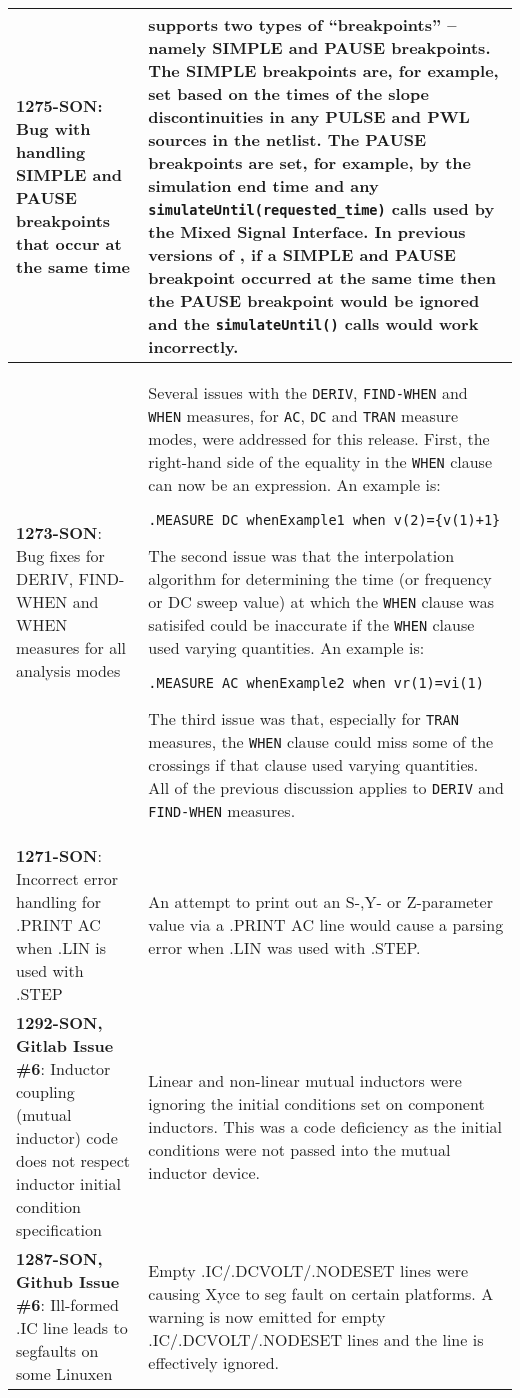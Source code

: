 {\begin{longtable}[h] {>{\raggedright\small}m{2in}|>{\raggedright\let\\\tabularnewline\small}m{3.5in}}
\textbf{1275-SON}: Bug with handling SIMPLE and PAUSE breakpoints that occur at the same time &
\Xyce{} supports two types of ``breakpoints'' -- namely SIMPLE and PAUSE breakpoints.  The SIMPLE
breakpoints are, for example, set based on the times of the slope discontinuities in any PULSE
and PWL sources in the netlist.  The PAUSE breakpoints are set, for example, by the simulation
end time and any \texttt{simulateUntil(requested\_time)} calls used by the Mixed Signal Interface.
In previous versions of \Xyce{}, if a SIMPLE and PAUSE breakpoint occurred at the same time
then the PAUSE breakpoint would be ignored and the \texttt{simulateUntil()} calls would work
incorrectly.
\\ \hline

\textbf{1273-SON}: Bug fixes for DERIV, FIND-WHEN and WHEN measures for all analysis modes &
Several issues with the \texttt{DERIV}, \texttt{FIND-WHEN} and \texttt{WHEN} measures, for \texttt{AC},
\texttt{DC} and \texttt{TRAN} measure modes, were addressed for this release.  First,
the right-hand side of the equality in the \texttt{WHEN} clause can now be an expression.
An example is:
\begin{verbatim}
.MEASURE DC whenExample1 when v(2)={v(1)+1}
\end{verbatim}
The second issue was that the interpolation algorithm for determining the time
(or frequency or DC sweep value) at which the \texttt{WHEN} clause was satisifed
could be inaccurate if the \texttt{WHEN} clause used varying quantities.
An example is:
\begin{verbatim}
.MEASURE AC whenExample2 when vr(1)=vi(1)
\end{verbatim}
The third issue was that, especially for \texttt{TRAN} measures, the \texttt{WHEN}
clause could miss some of the crossings if that clause used varying quantities.  All of
the previous discussion applies to \texttt{DERIV} and \texttt{FIND-WHEN} measures.
\\ \hline

\textbf{1271-SON}: Incorrect error handling for .PRINT AC when .LIN is used with
.STEP & An attempt to print out an S-,Y- or Z-parameter value via a .PRINT AC line
would cause a parsing error when .LIN was used with .STEP.
\\ \hline

\textbf{1292-SON, Gitlab Issue \#6}: Inductor coupling (mutual inductor) code does not respect inductor initial condition specification &
Linear and non-linear mutual inductors were ignoring the initial conditions set on 
component inductors.  This was a code deficiency as the initial conditions were not 
passed into the mutual inductor device.
\\ \hline

\textbf{1287-SON, Github Issue \#6}: Ill-formed .IC line leads to segfaults on some Linuxen
& Empty .IC/.DCVOLT/.NODESET lines were causing Xyce to seg fault on certain platforms.
A warning is now emitted for empty .IC/.DCVOLT/.NODESET lines and the line is effectively ignored.
\\ \hline

\end{longtable}
}

